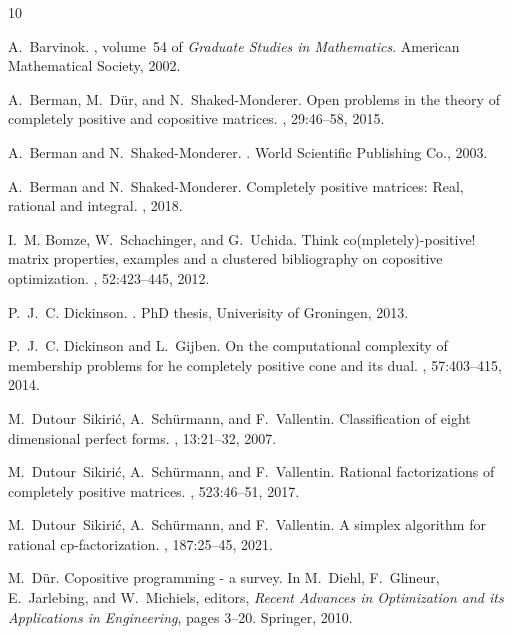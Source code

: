 \documentclass{commat}
\begin{document}
{\small
\begin{thebibliography}{10}

A.~Barvinok.
, volume~54 of {\em Graduate Studies in
  Mathematics}.
\newblock American Mathematical Society, 2002.

A.~Berman, M.~Dür, and N.~Shaked-Monderer.
\newblock Open problems in the theory of completely positive and copositive
  matrices.
, 29:46--58, 2015.

A.~Berman and N.~Shaked-Monderer.
.
\newblock World Scientific Publishing Co., 2003.

A.~Berman and N.~Shaked-Monderer.
\newblock Completely positive matrices: Real, rational and integral.
, 2018.

I.~M. Bomze, W.~Schachinger, and G.~Uchida.
\newblock Think co(mpletely)-positive! matrix properties, examples and a
  clustered bibliography on copositive optimization.
, 52:423--445, 2012.

P.~J.~C. Dickinson.
.
\newblock PhD thesis, Univerisity of Groningen, 2013.

P.~J.~C. Dickinson and L.~Gijben.
\newblock On the computational complexity of membership problems for he
  completely positive cone and its dual.
, 57:403--415, 2014.

M.~Dutour~Sikirić, A.~Schürmann, and F.~Vallentin.
\newblock Classification of eight dimensional perfect forms.
, 13:21--32, 2007.

M.~Dutour~Sikirić, A.~Schürmann, and F.~Vallentin.
\newblock Rational factorizations of completely positive matrices.
, 523:46--51, 2017.

M.~Dutour~Sikirić, A.~Schürmann, and F.~Vallentin.
\newblock A simplex algorithm for rational cp-factorization.
, 187:25--45, 2021.

M.~Dür.
\newblock Copositive programming - a survey.
\newblock In M.~Diehl, F.~Glineur, E.~Jarlebing, and W.~Michiels, editors, {\em
  Recent Advances in Optimization and its Applications in Engineering}, pages
  3--20. Springer, 2010.


\end{thebibliography}}
\end{document}
